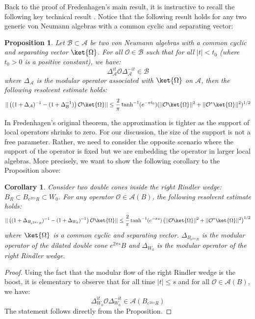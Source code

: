 \documentclass[a4paper,11pt]{article}
\newtheorem{corollary}[theorem]{Corollary}
\newtheorem{proposition}[theorem]{Proposition}
\theoremstyle{definition}
\theoremstyle{remark}
\newcommand{\lb}{\left(}
\newcommand{\rb}{\right)}
\begin{document}
Back to the proof of Fredenhagen's main result, it is instructive to recall the following key technical result \cite{fredenhagen}. Notice that the following result holds for any two generic von Neumann algebras with a common cyclic and separating vector:
\begin{proposition}
    Let $\mathcal{B}\subset \mathcal{A}$ be two von Neumann algebras with a common cyclic and separating vector $\ket{\Omega}$. For all $\mathcal{O}\in\mathcal{B}$ such that for all $|t| < t_0$ (where $t_0 > 0$ is a positive constant), we have:
    \begin{equation}
        \Delta_\mathcal{A}^{it}\mathcal{O}\Delta_\mathcal{A}^{-it}\in\mathcal{B}
    \end{equation}
    where $\Delta_\mathcal{A}$ is the modular operator associated with $\ket{\Omega}$ on $\mathcal{A}$, then the following resolvent estimate holds:
    \begin{equation}
        ||\lb(1 + \Delta_\mathcal{A})^{-1} - (1 + \Delta_\mathcal{B}^{-1})\rb\mathcal{O}\ket{\Omega}|| \leq \frac{2}{\pi}\tanh^{-1}(e^{-\pi t_0})(||\mathcal{O}\ket{\Omega}||^2 + ||\mathcal{O}^*\ket{\Omega}||^2)^{1/2}
    \end{equation}
\end{proposition}
In Fredenhagen's original theorem, the approximation is tighter as the support of local operators shrinks to zero. For our discussion, the size of the support is not a free parameter. Rather, we need to consider the opposite scenario where the support of the operator is fixed but we are embedding the operator in larger local algebras. More precisely, we want to show the following corollary to the Proposition above:
\begin{corollary}
    Consider two double cones inside the right Rindler wedge: $B_R\subset B_{e^{2\pi s}R}\subset W_0$. For any operator $\mathcal{O}\in\mathcal{A}(B)$, the following resolvent estimate holds:
    \begin{equation}
        ||\lb(1 + \Delta_{B_{e^{2\pi s}R}})^{-1} - (1 + \Delta_{W_0})^{-1}\rb\mathcal{O}\ket{\Omega}||\leq \frac{2}{\pi}\tanh^{-1}(e^{-\pi s})\lb||\mathcal{O}\ket{\Omega}||^2 + ||\mathcal{O}^*\ket{\Omega}||^2\rb^{1/2}
    \end{equation}
    where $\ket{\Omega}$ is a common cyclic and separating vector. $\Delta_{B_{e^{2\pi s}R}}$ is the modular operator of the dilated double cone $e^{2\pi s}B$ and $\Delta_{W_0}$ is the modular operator of the right Rindler wedge.
\end{corollary}
\begin{proof}
    Using the fact that the modular flow of the right Rindler wedge is the boost, it is elementary to observe that for all time $|t|\leq s$ and for all $\mathcal{O}\in\mathcal{A}(B)$, we have:
    \begin{equation}
        \Delta_{W_0}^{it}\mathcal{O}\Delta^{-it}_{W_0} \in \mathcal{A}(B_{e^{2\pi s}R})
    \end{equation}
    The statement follows directly from the Proposition.
\end{proof}
\end{document}
